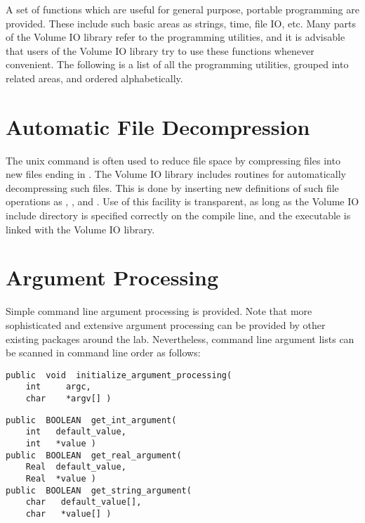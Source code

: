 A set of functions which are useful for general purpose, portable
programming are provided.  These include such basic areas as strings,
time, file IO, etc.  Many parts of the Volume IO library refer
to the programming utilities, and it is advisable that users of the
Volume IO library try to use these functions whenever convenient.
The following is a list of all the programming utilities, grouped into
related areas, and ordered alphabetically.

\section{Automatic File Decompression}

The unix command  is often used to reduce file space by
compressing files into new files ending in .  The Volume IO
library includes routines for automatically decompressing such files.
This is done by inserting new definitions of such file operations as
, , and .  Use of this facility
is transparent, as long as the Volume IO include directory is specified
correctly on the compile line, and the executable is linked with the
Volume IO library.

\section{Argument Processing}

Simple command line argument processing is provided.  Note that more
sophisticated and extensive argument processing can be provided by
other existing packages around the lab.  Nevertheless, command line
argument lists can be scanned in command line order as follows:

{\bf\begin{verbatim}
public  void  initialize_argument_processing(
    int     argc,
    char    *argv[] )
\end{verbatim}}


{\bf\begin{verbatim}
public  BOOLEAN  get_int_argument(
    int   default_value,
    int   *value )
public  BOOLEAN  get_real_argument(
    Real  default_value,
    Real  *value )
public  BOOLEAN  get_string_argument(
    char   default_value[],
    char   *value[] )
\end{verbatim}}

